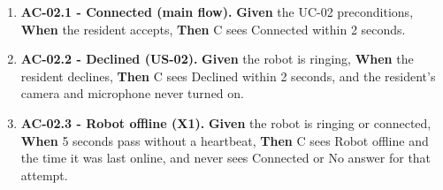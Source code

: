 \documentclass[12pt,letterpaper]{article}
\begin{document}
\begin{enumerate}\setlength{\itemsep}{2pt}

\item \textbf{AC-02.1 - Connected (main flow).} \textbf{Given} the UC-02 preconditions, \textbf{When} the resident accepts, \textbf{Then} C sees Connected within 2 seconds.

\item \textbf{AC-02.2 - Declined (US-02).} \textbf{Given} the robot is ringing, \textbf{When} the resident declines, \textbf{Then} C sees Declined within 2 seconds, and the resident's camera and microphone never turned on.

\item \textbf{AC-02.3 - Robot offline (X1).} \textbf{Given} the robot is ringing or connected, \textbf{When} 5 seconds pass without a heartbeat, \textbf{Then} C sees Robot offline and the time it was last online, and never sees Connected or No answer for that attempt.

\end{enumerate}
\end{document}
